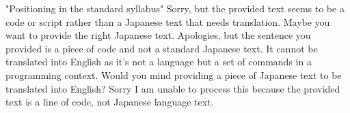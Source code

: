 "Positioning in the standard syllabus"
Sorry, but the provided text seems to be a code or script rather than a Japanese text that needs translation. Maybe you want to provide the right Japanese text.
Apologies, but the sentence you provided is a piece of code and not a standard Japanese text. It cannot be translated into English as it's not a language but a set of commands in a programming context. Would you mind providing a piece of Japanese text to be translated into English?
Sorry I am unable to process this because the provided text is a line of code, not Japanese language text.
